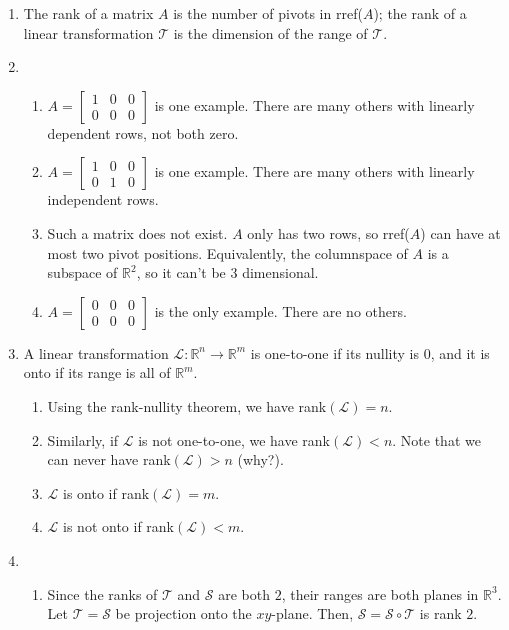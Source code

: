 \documentclass[red]{tutorial}
\newcommand{\R}{\mathbb{R}}
\theoremstyle{definition}
\theoremstyle{theorem}
\begin{document}
	\begin{solutions}
		\begin{enumerate}
			\item 
					The rank of a matrix $A$ is the number of pivots in rref($A$);
					the rank of a linear transformation $\mathcal T$ is the dimension of the range of $\mathcal T$.
			\item
			\begin{enumerate}
				\item $A=\begin{bmatrix}
					1 & 0 & 0 \\
					0 & 0 & 0 
					\end{bmatrix}$ is one example. There are many others with linearly dependent rows, not both zero.
				\item $A=\begin{bmatrix}
					1 & 0 & 0 \\
					0 & 1 & 0 
					\end{bmatrix}$ is one example. There are many others with linearly independent rows.
				\item Such a matrix does not exist. $A$ only has two rows, so rref($A$) can have at most two pivot positions. Equivalently, the columnspace of $A$ is a subspace of $\R^2$, so it can't be $3$ dimensional. 
				\item $A=\begin{bmatrix}
					0 & 0 & 0 \\
					0 & 0 & 0 
					\end{bmatrix}$ is the only example. There are no others. 
			\end{enumerate}
			\item A linear transformation $\mathcal L:\R^n\to\R^m$ 
				is one-to-one if its nullity is $0$, and it is onto if its range is 
				all of $\R^m$. 
			\begin{enumerate}
				\item Using the rank-nullity theorem, we have rank$(\mathcal L) = n$. 
				\item Similarly, if $\mathcal L$ is not one-to-one, we have rank$(\mathcal L) < n$. Note that we can never have rank$(\mathcal L)>n$ (why?).
				\item $\mathcal L$ is onto if rank$(\mathcal L)=m$. 
				\item $\mathcal L$ is not onto if rank$(\mathcal L)<m$. 
			\end{enumerate}
			\item 
			\begin{enumerate}
				\item Since the ranks of $\mathcal T$ and $\mathcal S$ are both $2$,
					their ranges are both planes in $\R^{3}$. Let $\mathcal T=\mathcal
					S$ be projection onto the $xy$-plane. Then,
					$\mathcal S=\mathcal S\circ \mathcal T$ is rank $2$.


\end{enumerate}
\end{enumerate}
\end{solutions}
\end{document}
